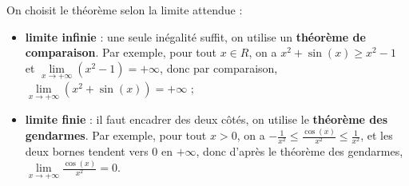 \documentclass[11pt,a4paper]{article}
\newcommand{\R}{\mathbb{R}}
\newcommand{\N}{\mathbb{N}}
\newcommand{\Z}{\mathbb{Z}}
\newcommand{\Q}{\mathbb{Q}}
\newcommand{\vect}[1]{\overrightarrow{#1}}
\newcommand{\fois}[1]{\times{\color{coulExo}#1}}
\providecommand{\Cf}{\mathcal{C}\sb{f}}%
\providecommand{\Cg}{\mathcal{C}\sb{g}}%
\def\R{R}\def\N{N}\def\Z{Z}\def\Q{Q}\def\vect#1{#1}\def\Cf{Cf}\def\Cg{Cg}\def\fois#1{×#1}%
\begin{document}
\begin{remarquebox}
On choisit le théorème selon la limite attendue :
\begin{itemize}
  \item \textbf{limite infinie} : une seule inégalité suffit, on utilise un
        \textbf{théorème de comparaison}. Par exemple, pour tout $x\in\R$, on a
        $x^{2}+\sin(x)\geq x^{2}-1$ et $\lim\limits_{x\to+\infty}\left(x^{2}-1\right)=+\infty$,
        donc par comparaison, $\lim\limits_{x\to+\infty}\left(x^{2}+\sin(x)\right)=+\infty$ ;
  \item \textbf{limite finie} : il faut encadrer des deux côtés, on utilise le
        \textbf{théorème des gendarmes}. Par exemple, pour tout $x>0$, on a
        $-\frac{1}{x^{2}}\leq\frac{\cos(x)}{x^{2}}\leq\frac{1}{x^{2}}$, et les deux bornes
        tendent vers $0$ en $+\infty$, donc d'après le théorème des gendarmes,
        $\lim\limits_{x\to+\infty}\frac{\cos(x)}{x^{2}}=0$.
\end{itemize}
\end{remarquebox}
\end{document}
